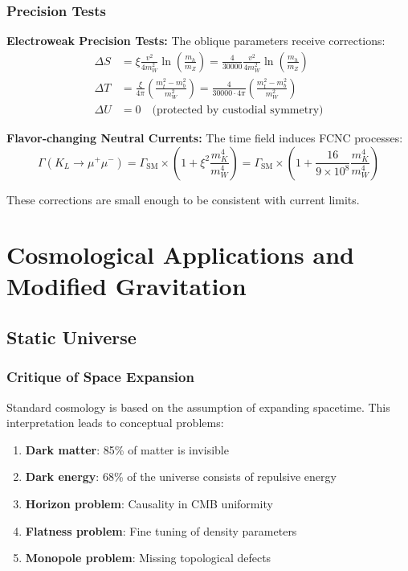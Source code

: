 \documentclass[12pt,a4paper]{report}
\newcommand{\xipar}{\xi}      %
\begin{document}
	\subsection{Precision Tests}\label{subsec:precision_tests}
	
	\textbf{Electroweak Precision Tests:}
	The oblique parameters receive corrections:
	\begin{align}
		\Delta S &= \xipar \frac{v^2}{4m_W^2} \ln\left(\frac{m_h}{m_Z}\right) = \frac{4}{30000} \frac{v^2}{4m_W^2} \ln\left(\frac{m_h}{m_Z}\right) \\
		\Delta T &= \frac{\xipar}{4\pi} \left(\frac{m_t^2 - m_b^2}{m_W^2}\right) = \frac{4}{30000 \cdot 4\pi} \left(\frac{m_t^2 - m_b^2}{m_W^2}\right) \\
		\Delta U &= 0 \quad \text{(protected by custodial symmetry)}
	\end{align}
	
	\textbf{Flavor-changing Neutral Currents:}
	The time field induces FCNC processes:
	\begin{equation}
		\Gamma(K_L \to \mu^+ \mu^-) = \Gamma_{\text{SM}} \times \left(1 + \xipar^2 \frac{m_K^4}{m_W^4}\right) = \Gamma_{\text{SM}} \times \left(1 + \frac{16}{9 \times 10^8} \frac{m_K^4}{m_W^4}\right)
	\end{equation}
	
	These corrections are small enough to be consistent with current limits.
	\chapter{Cosmological Applications and Modified Gravitation}\label{chap:cosmology}
	
	\section{Static Universe}\label{sec:static_universe}
	
	\subsection{Critique of Space Expansion}\label{subsec:critique_space_expansion}
	
	Standard cosmology is based on the assumption of expanding spacetime. This interpretation leads to conceptual problems:
	
	\begin{enumerate}
		\item \textbf{Dark matter}: 85\% of matter is invisible
		\item \textbf{Dark energy}: 68\% of the universe consists of repulsive energy
		\item \textbf{Horizon problem}: Causality in CMB uniformity
		\item \textbf{Flatness problem}: Fine tuning of density parameters
		\item \textbf{Monopole problem}: Missing topological defects
	\end{enumerate}
	
\end{document}
